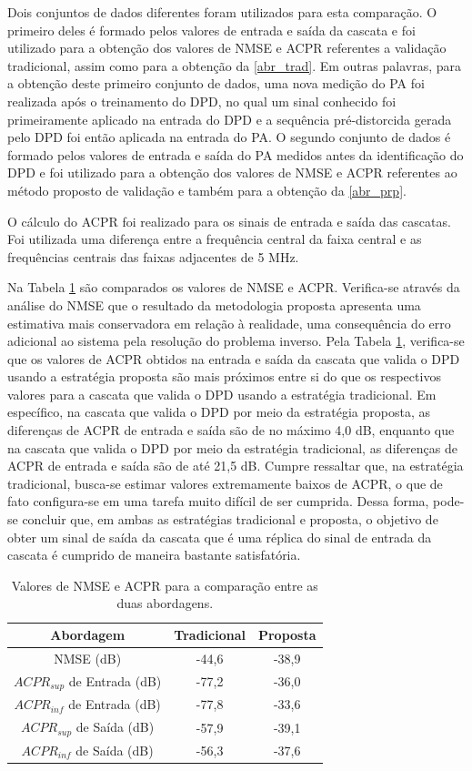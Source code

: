 {Dois conjuntos de dados diferentes foram utilizados para esta comparação. O primeiro deles é formado pelos valores de entrada e saída da cascata e foi utilizado para a obtenção dos valores de NMSE e ACPR referentes a validação tradicional, assim como para a obtenção da \autoref{abr_trad}. Em outras palavras, para a obtenção deste primeiro conjunto de dados, uma nova medição do PA foi realizada após o treinamento do DPD, no qual um sinal conhecido foi primeiramente aplicado na entrada do DPD e a sequência pré-distorcida gerada pelo DPD foi então aplicada na entrada do PA. O segundo conjunto de dados é formado pelos valores de entrada e saída do PA medidos antes da identificação do DPD e foi utilizado para a obtenção dos valores de NMSE e ACPR referentes ao método proposto de validação e também para a obtenção da \autoref{abr_prp}.}

{O cálculo do ACPR foi realizado para os sinais de entrada e saída das cascatas. Foi utilizada uma diferença entre a frequência central da faixa central e as frequências centrais das faixas adjacentes de 5 MHz.}

{Na Tabela \ref{nmse_comp} são comparados os valores de NMSE e ACPR. Verifica-se através da análise do NMSE que o resultado da metodologia proposta apresenta uma estimativa mais conservadora em relação à realidade, uma consequência do erro adicional ao sistema pela resolução do problema inverso. Pela Tabela \ref{nmse_comp}, verifica-se que os valores de ACPR obtidos na entrada e saída da cascata que valida o DPD usando a estratégia proposta são mais próximos entre si do que os respectivos valores para a cascata que valida o DPD usando a estratégia tradicional. Em específico, na cascata que valida o DPD por meio da estratégia proposta, as diferenças de ACPR de entrada e saída são de no máximo 4,0 dB, enquanto que na cascata que valida o DPD por meio da estratégia tradicional, as diferenças de ACPR de entrada e saída são de até 21,5 dB. Cumpre ressaltar que, na estratégia tradicional, busca-se estimar valores extremamente baixos de ACPR, o que de fato configura-se em uma tarefa muito difícil de ser cumprida. Dessa forma, pode-se concluir que, em ambas as estratégias tradicional e proposta, o objetivo de obter um sinal de saída da cascata que é uma réplica do sinal de entrada da cascata é cumprido de maneira bastante satisfatória.}

\begin{table}[!tbh]
\centering
\caption{Valores de NMSE e ACPR para a comparação entre as duas abordagens.}
\begin{tabular}{|c|c|c|}
\hline 
\textbf{Abordagem} & \textbf{Tradicional} & \textbf{Proposta}\\ 
\hline 
NMSE (dB) & -44,6 & -38,9 \\
\hline
$ACPR_{sup}$ de Entrada (dB) & -77,2 & -36,0 \\ 
\hline 
$ACPR_{inf}$ de Entrada (dB) & -77,8 & -33,6 \\ 
\hline 
$ACPR_{sup}$ de Saída (dB) & -57,9 & -39,1 \\ 
\hline 
$ACPR_{inf}$ de Saída (dB) & -56,3 & -37,6 \\ 
\hline 
\end{tabular}
\label{nmse_comp}
\end{table}

